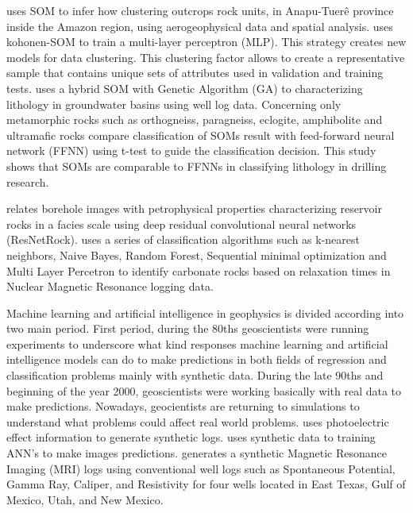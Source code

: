 \documentclass[preprint,12pt]{elsarticle}
\begin{document}
\citet{Carneiro2012} uses SOM to infer how clustering outcrops rock units, in Anapu-Tuer\^e province inside the Amazon region, using aerogeophysical data and spatial analysis. \citet{Pastukhov2016} uses kohonen-SOM to train a multi-layer perceptron (MLP). This strategy creates new models for data clustering. This clustering factor allows to create a representative sample that contains unique sets of attributes used in validation and training tests. \citet{Sahoo2017} uses a hybrid SOM with Genetic Algorithm (GA) to characterizing lithology in groundwater basins using well log data. Concerning only metamorphic rocks such as orthogneiss, paragneiss, eclogite, amphibolite and ultramafic rocks \citet{Konate2015} compare classification of SOMs result with feed-forward neural network (FFNN) using t-test to guide the classification decision. This study shows that SOMs are comparable to FFNNs in classifying lithology in drilling research.   

\citet{Valentin2019} relates borehole images with petrophysical properties characterizing reservoir rocks in a facies scale using deep residual convolutional neural networks (ResNetRock). \citet{Goncalves2017} uses a series of classification algorithms such as k-nearest neighbors, Naive Bayes, Random Forest, Sequential minimal optimization and Multi Layer Percetron to identify carbonate rocks based on relaxation times in Nuclear Magnetic Resonance logging data. 

Machine learning and artificial intelligence in geophysics is divided according \citet{Poulton2002} into two main period. First period, during the 80ths geoscientists were running experiments to underscore what kind responses machine learning and artificial intelligence models can do to make predictions in both fields of regression and classification problems mainly with synthetic data. During the late 90ths and beginning of the year 2000, geoscientists were working basically with real data to make predictions. Nowadays, geocientists are returning to simulations to understand what problems could affect real world problems. \citet{Akinnikawe2018} uses photoelectric effect information to generate synthetic logs. \citet{Zhang2016} uses synthetic data to training ANN's to make images predictions. \citet{Rolon2009,Rolon2005} generates a synthetic Magnetic Resonance Imaging (MRI) logs using conventional well logs such as Spontaneous Potential, Gamma Ray, Caliper, and Resistivity for four wells located in East Texas, Gulf of Mexico, Utah, and New Mexico.       
\end{document}
